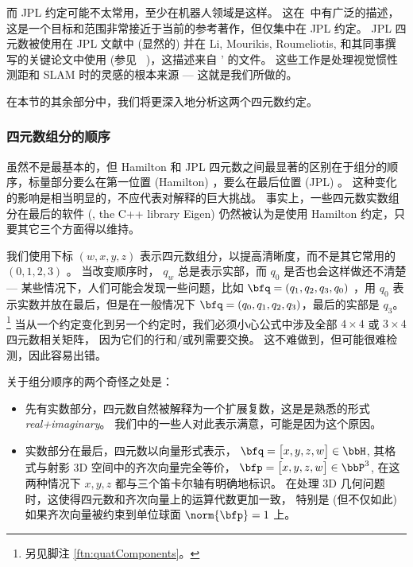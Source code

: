 而 JPL 约定可能不太常用，至少在机器人领域是这样。 
这在~\citep{TRAWNY-05-QUAT}中有广泛的描述，这是一个目标和范围非常接近于当前的参考著作，但仅集中在 JPL 约定。 
JPL 四元数被使用在 JPL 文献中 (显然的) 并在 Li, Mourikis, Roumeliotis, 和其同事撰写的关键论文中使用 (参见 \eg~\citep{LI-2012,LI-14})，这描述来自 \citeauthor{TRAWNY-05-QUAT}' 的文件。 
这些工作是处理视觉惯性测距和 SLAM 时的灵感的根本来源 --- 这就是我们所做的。 

在本节的其余部分中，我们将更深入地分析这两个四元数约定。


\subsubsection{四元数组分的顺序}

虽然不是最基本的，但 Hamilton 和 JPL 四元数之间最显著的区别在于组分的顺序，标量部分要么在第一位置 (Hamilton) ，要么在最后位置 (JPL) 。 
这种变化的影响是相当明显的，不应代表对解释的巨大挑战。 
事实上，一些四元数实数组分在最后的软件 (\eg, the C++ library Eigen) 仍然被认为是使用 Hamilton 约定，只要其它三个方面得以维持。

我们使用下标 $(w, x, y, z)$ 表示四元数组分，以提高清晰度，而不是其它常用的 $(0, 1, 2, 3)$ 。
当改变顺序时， $q_w$ 总是表示实部，而 $q_0$ 是否也会这样做还不清楚 
--- 某些情况下，人们可能会发现一些问题，比如 $\bfq=(q_1, q_2, q_3, q_0)$ ，用 $q_0$ 表示实数并放在最后，但是在一般情况下 $\bfq=(q_0, q_1, q_2, q_3)$，最后的实部是 $q_3$。%
\footnote{另见脚注 \ref{ftn:quatComponents}。} 
当从一个约定变化到另一个约定时，我们必须小心公式中涉及全部 $4\times4$ 或 $3\times4$ 四元数相关矩阵， 
因为它们的行和/或列需要交换。 
这不难做到，但可能很难检测，因此容易出错。

关于组分顺序的两个奇怪之处是：
%
\begin{itemize}
\item
先有实数部分，四元数自然被解释为一个扩展复数，这是是熟悉的形式 \emph{real+imaginary}。
我们中的一些人对此表示满意，可能是因为这个原因。
\item
实数部分在最后，四元数以向量形式表示，
%
$\bfq=\begin{bmatrix}
x,y,z,w
\end{bmatrix}\in\bbH$, 
%
其格式与射影 3D 空间中的齐次向量完全等价， 
%
$\bfp=\begin{bmatrix}
x,y,z,w
\end{bmatrix}\in\bbP^3$, 
%
在这两种情况下 $x,y,z$ 都与三个笛卡尔轴有明确地标识。 
在处理 3D 几何问题时，这使得四元数和齐次向量上的运算代数更加一致， 
特别是 (但不仅如此) 如果齐次向量被约束到单位球面 $\norm{\bfp}=1$ 上。
\end{itemize}

